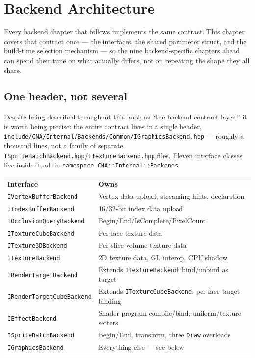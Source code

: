 \chapter{Backend Architecture}
\label{ch:backend-architecture}

Every backend chapter that follows implements the same contract. This chapter covers that
contract once --- the interfaces, the shared parameter struct, and the build-time selection
mechanism --- so the nine backend-specific chapters ahead can spend their time on what
actually differs, not on repeating the shape they all share.

\section{One header, not several}

Despite  being described throughout this book as ``the backend
contract layer,'' it is worth being precise: the entire contract lives in a single header,
\texttt{include/CNA/Internal/Backends/Common/IGraphicsBackend.hpp} --- roughly a thousand
lines, not a family of separate \texttt{ISpriteBatchBackend.hpp}/\texttt{ITextureBackend.hpp}
files. Eleven interface classes live inside it, all in
\texttt{namespace CNA::Internal::Backends}:

\begin{center}
\begin{tabular}{ll}
\toprule
\textbf{Interface} & \textbf{Owns} \\
\midrule
\texttt{IVertexBufferBackend} & Vertex data upload, streaming hints, declaration \\
\texttt{IIndexBufferBackend} & 16/32-bit index data upload \\
\texttt{IOcclusionQueryBackend} & Begin/End/IsComplete/PixelCount \\
\texttt{ITextureCubeBackend} & Per-face texture data \\
\texttt{ITexture3DBackend} & Per-slice volume texture data \\
\texttt{ITextureBackend} & 2D texture data, GL interop, CPU shadow \\
\texttt{IRenderTargetBackend} & Extends \texttt{ITextureBackend}: bind/unbind as target \\
\texttt{IRenderTargetCubeBackend} & Extends \texttt{ITextureCubeBackend}: per-face target binding \\
\texttt{IEffectBackend} & Shader program compile/bind, uniform/texture setters \\
\texttt{ISpriteBatchBackend} & Begin/End, transform, three \texttt{Draw} overloads \\
\texttt{IGraphicsBackend} & Everything else --- see below \\
\bottomrule
\end{tabular}
\end{center}

